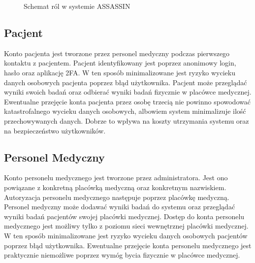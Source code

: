 \documentclass{documentation}
\begin{document}
\begin{figure}[h!]
    \centering
    \caption{Schemat ról w systemie ASSASSIN\label{fig:roles}}
\end{figure}

\subsection{Pacjent}

Konto pacjenta jest tworzone przez personel medyczny podczas pierwszego kontaktu z pacjentem.
Pacjent identyfikowany jest poprzez anonimowy login, hasło oraz aplikację 2FA.
W ten sposób minimalizowane jest ryzyko wycieku danych osobowych pacjenta poprzez błąd użytkownika.
Pacjent może przeglądać wyniki swoich badań oraz odbierać wyniki badań fizycznie w placówce medycznej.
Ewentualne przejęcie konta pacjenta przez osobę trzecią nie powinno spowodować katastrofalnego wycieku danych osobowych, albowiem system minimalizuje ilość przechowywanych danych.
Dobrze to wpływa na koszty utrzymania systemu oraz na bezpieczeństwo użytkowników.

\subsection{Personel Medyczny}

Konto personelu medycznego jest tworzone przez administratora.
Jest ono powiązane z konkretną placówką medyczną oraz konkretnym nazwiskiem.
Autoryzacja personelu medycznego następuje poprzez placówkę medyczną.
Personel medyczny może dodawać wyniki badań do systemu oraz przeglądać wyniki badań pacjentów swojej placówki medycznej.
Dostęp do konta personelu medycznego jest możliwy tylko z poziomu sieci wewnętrznej placówki medycznej.
W ten sposób minimalizowane jest ryzyko wycieku danych osobowych pacjentów poprzez błąd użytkownika.
Ewentualne przejęcie konta personelu medycznego jest praktycznie niemożliwe poprzez wymóg bycia fizycznie w placówce medycznej.
\end{document}
